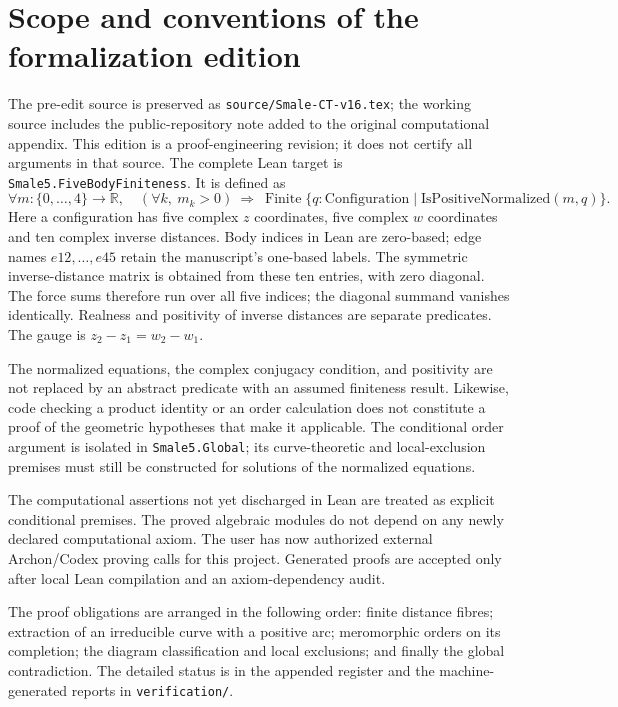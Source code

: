 \documentclass[Threeside,11pt]{article}
\theoremstyle{definition}
\theoremstyle{remark}
\numberwithin{equation}{section}
\theoremstyle{remark}
\newcommand{\code}[1]{\begingroup\def\_{\textunderscore\allowbreak}\texttt{#1}\endgroup}
\begin{document}
\section*{Scope and conventions of the formalization edition}
The pre-edit source is preserved as \code{source/Smale\_5-CT-v16.tex}; the
working source includes the public-repository note added to the original
computational appendix. This edition is a
proof-engineering revision; it does not certify all arguments in that source.
The complete Lean target is \code{Smale5.FiveBodyFiniteness}. It is defined as
\[
 \forall m:\{0,\ldots,4\}\to\mathbb R,\quad
 (\forall k,\ m_k>0)\ \Longrightarrow\
 \operatorname{Finite}\{q:\mathrm{Configuration}\mid
                \mathrm{IsPositiveNormalized}(m,q)\}.
\]
Here a configuration has five complex $z$ coordinates, five complex $w$
coordinates and ten complex inverse distances. Body indices in Lean are
zero-based; edge names $e12,\ldots,e45$ retain the manuscript's one-based labels.
The symmetric inverse-distance matrix is obtained from these ten entries, with
zero diagonal. The force sums therefore run over all five indices; the diagonal
summand vanishes identically. Realness and positivity of inverse distances are
separate predicates. The gauge is $z_2-z_1=w_2-w_1$.

The normalized equations, the complex conjugacy condition, and positivity are
not replaced by an abstract predicate with an assumed finiteness result.
Likewise, code checking a product identity or an order calculation does not
constitute a proof of the geometric hypotheses that make it applicable.
The conditional order argument is isolated in \code{Smale5.Global}; its
curve-theoretic and local-exclusion premises must still be constructed for
solutions of the normalized equations.

The computational assertions not yet discharged in Lean are treated as
explicit conditional premises. The proved algebraic modules do not depend
on any newly declared computational axiom. The user has now authorized external Archon/Codex proving calls for this
project. Generated proofs are accepted only after local Lean compilation
and an axiom-dependency audit.

The proof obligations are arranged in the following order: finite distance
fibres; extraction of an irreducible curve with a positive arc; meromorphic
orders on its completion; the diagram classification and local exclusions;
and finally the global contradiction. The detailed status is in the appended
register and the machine-generated reports in \code{verification/}.
\end{document}
